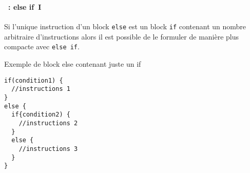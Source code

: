 \begin{frame}[containsverbatim]
  \frametitle{\secname}
  \framesubtitle{\subsecname~: else if~I}

  Si l'unique instruction d'un block \verb|else| est un block \verb|if| contenant un nombre arbitraire d'instructions alors il est possible de le formuler de 
  manière plus compacte avec \verb|else if|.
  {\small\begin{exampleblock}{Exemple de block else contenant juste un if}
    \begin{verbatim}
if(condition1) {
  //instructions 1
}
else {
  if{condition2) {
    //instructions 2
  }
  else {
    //instructions 3
  }
}\end{verbatim}
 \end{exampleblock}}
\end{frame}

